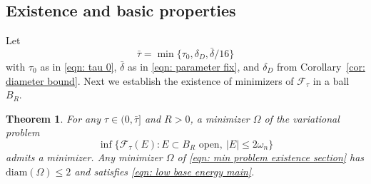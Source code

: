\documentclass[10pt, reqno]{amsart}
\numberwithin{equation}{section}
\newtheorem{theorem}{Theorem}[section]
\def\W{\Omega}
\def\err{\tau}
\def\Ep{\mathcal{F}_{\err}}
\def\ccdel{\bar{\delta}}
\begin{document}
 \subsection{Existence and basic properties}  Let
 \begin{equation}
     \label{eqn: tau fix}
     \bar{\tau} = \min\{\tau_0, \delta_D, \bar{\delta}/16\}
 \end{equation}
with $\tau_0$ as in \eqref{eqn: tau 0}, $\ccdel$  as in \eqref{eqn: parameter fix}, and $\delta_D$ from Corollary~\ref{cor: diameter bound}. Next we establish the existence of minimizers of $\Ep$ in a ball $B_R.$

\begin{theorem}\label{theorem: existence} For any $\tau \in (0,\bar{\tau}]$ and  $R>0$,  a  minimizer $\W$ of the variational problem 
	\begin{equation}
		\label{eqn: min problem existence section}
	\inf\{ \Ep(E) : E \subset B_R \text{ open}, \  |E|\leq 2\omega_n\}
	\end{equation}
	admits a minimizer. Any minimizer $\W$  of \eqref{eqn: min problem existence section} has $\text{diam}(\W) \leq 2$ and satisfies \eqref{eqn: low base energy main}.
    \end{theorem}
\end{document}
